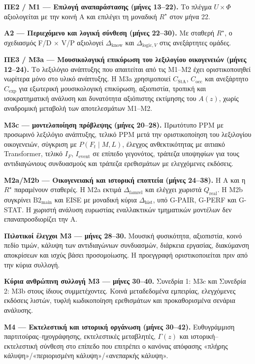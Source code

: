 \documentclass[11pt,a4paper]{article}
\begin{document}
\textbf{ΠΕ2 / M1 --- Επιλογή αναπαράστασης (μήνες 13--22).} Το πλέγμα $U\times\Phi$ αξιολογείται με την κοινή Α και επιλέγει τη μοναδική $R^\star$ στον μήνα 22.

\textbf{Α2 --- Περιεχόμενο και λογική σύνθεση (μήνες 22--30).} Με σταθερή $R^\star$, ο σχεδιασμός F/D $\times$ V/P αξιολογεί $\Delta_{\mathrm{know}}$ και $\Delta_{\mathrm{logic},V}$ στις ανεξάρτητες ομάδες.

\textbf{ΠΕ3 / M3a --- Μουσικολογική επικύρωση του λεξιλογίου οικογενειών (μήνες 12--24).} Το λεξιλόγιο ανάπτυξης που απαιτείται από τις M1--M2 έχει οριστικοποιηθεί νωρίτερα μόνο στο υλικό ανάπτυξης. Η M3a χρησιμοποιεί $C_{\mathrm{StA}}$, $C_{\mathrm{occ}}$ και ανεξάρτητο $C_{\mathrm{exp}}$ για εξωτερική μουσικολογική επικύρωση, αξιοπιστία, τροπική και ισοκρατηματική ανάλυση και δυνατότητα αξιόπιστης εκτίμησης του $A(z)$, χωρίς αναδρομική μεταβολή των αποτελεσμάτων M1--M2.

\textbf{M3c --- μοντελοποίηση πρόβλεψης (μήνες 20--28).} Πρωτότυπο PPM με προσωρινό λεξιλόγιο ανάπτυξης, τελικό PPM μετά την οριστικοποίηση του λεξιλογίου οικογενειών, σύγκριση με $P(F_t\mid M,L)$, έλεγχος ανθεκτικότητας με αιτιακό Transformer, τελικό $I_F$, $I_{\mathrm{event}}$ σε επίπεδο γεγονότος, τράπεζα υποψηφίων για τους αντιδιαγώνιους συνδυασμούς και τράπεζα ερεθισμάτων με ελεγχόμενες εκδόσεις.

\textbf{M2a/M2b --- Οικογενειακή και ιστορική εποπτεία (μήνες 24--38).} Η Α και η $R^\star$ παραμένουν σταθερές. Η M2a εκτιμά $\Delta_{\mathrm{famrel}}$ και ελέγχει χωριστά $Q_{\mathrm{real}}$. Η M2b συγκρίνει $\mathrm{B2}_{\mathrm{main}}$ και EISE με μοναδική κύρια $\Delta_{\mathrm{hist}}$, υπό G-PAIR, G-PERF και G-STAT. Η χωριστή ανάλυση ευρωστίας εναλλακτικών τμηματικών μοντέλων δεν επαναπροσδιορίζει την A.

\textbf{Πιλοτικοί έλεγχοι M3 --- μήνες 28--30.} Μουσική φυσικότητα, αξιοπιστία, κοινό πεδίο τιμών, κάλυψη των αντιδιαγώνιων συνδυασμών, διάρκεια εργασίας, διακύμανση αποκρίσεων και ισχύς βάσει προσομοίωσης. Η προεγγραφή οριστικοποιείται πριν από την κύρια συλλογή.

\textbf{Κύρια ανθρώπινη συλλογή M3 --- μήνες 30--40.} Συνεδρία 1: M3c και Συνεδρία 2: M3b στους ίδιους συμμετέχοντες. Κοινά μεταδεδομένα εμπειρίας, ελεγχόμενες εκδόσεις λιστών, τυφλή κωδικοποίηση ερεθισμάτων και προκαθορισμένα σενάρια ανάλυσης.

\textbf{M4 --- Εκτελεστική και ιστορική οργάνωση (μήνες 30--42).} Ευθυγράμμιση παρτιτούρας--ηχογράφησης, εκτελεστικές μεταβλητές, $\Gamma(z)$ και ιστορική–εκτελεστική σύνθεση στο επίπεδο που επιτρέπει ο κανόνας απόφασης «πλήρης κάλυψη»/«περιορισμένη κάλυψη»/«ανεπαρκής κάλυψη».
\end{document}
